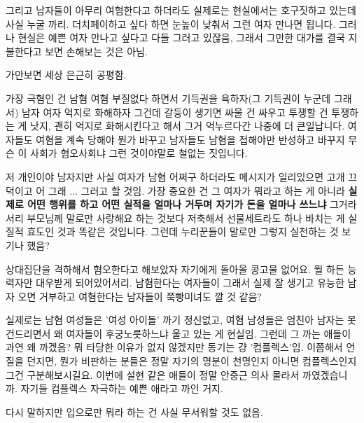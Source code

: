 그리고 남자들이 아무리 여혐한다고 하더라도 실제로는 현실에서는 호구짓하고 있는데 사실 누굴 까리.
더치페이하고 싶다 하면 눈높이 낮춰서 그런 여자 만나면 됩니다.
그러나 현실은 예쁜 여자 만나고 싶다고 다들 그러고 있잖음, 그래서 그만한 대가를 결국 지불한다고 보면 손해보는 것은 아님.
\vspace{5mm}

가만보면 세상 은근히 공평함.
\vspace{5mm}

가장 극혐인 건 남혐 여혐 부질없다 하면서 기득권을 욕하자(그 기득권이 누군데 그래서) 남자 여자 억지로 화해하자 그건데
갈등이 생기면 싸울 건 싸우고 투쟁할 건 투쟁하는 게 낫지, 괜히 억지로 화해시킨다고 해서 그거 억누르다간 나중에 더 큰일납니다.
여자들도 여혐을 계속 당해야 뭔가 바꾸고 남자들도 남혐을 접해야만 반성하고 바꾸지
무슨 이 사회가 혐오사회냐 그런 것이야말로 철없는 짓입니다.
\vspace{5mm}

저 개인이야 남자지만 사실 여자가 남혐 어쩌구 하더라도 메시지가 일리있으면 고개 끄덕이고 어 그래 ... 그러고 할 것임.
가장 중요한 건 그 여자가 뭐라고 하는 게 아니라 \textbf{실제로 어떤 행위를 하고 어떤 실적을 얼마나 거두며 자기가 돈을 얼마나 쓰느냐} 그거라서리
부모님께 말로만 사랑해요 하는 것보다 저축해서 선물세트라도 하나 바치는 게 실질적 효도인 것과 똑같은 것입니다.
그런데 누리꾼들이 말로만 그렇지 실천하는 것 보기나 했음?
\vspace{5mm}

상대집단을 격하해서 혐오한다고 해보았자 자기에게 돌아올 콩고물 없어요.
뭘 하든 능력자만 대우받게 되어있어서리.
남혐한다는 여자들이 그래서 실제 잘 생기고 유능한 남자 오면 거부하고 여혐한다는 남자들이 쭉빵미녀도 깔 것 같음?
\vspace{5mm}

실제로는 남혐 여성들은 '여성 아이돌' 까기 정신없고, 여혐 남성들은 엄친아 남자는 못 건드리면서 왜 여자들이 후궁노릇하느냐 울고 있는 게 현실임.
그런데 그 까는 애들이 과연 왜 까겠음? 뭐 타당한 이유가 없지 않겠지만 동기는 걍 '컴플렉스'임.
이쯤해서 언질을 던지면, 뭔가 비판하는 분들은 정말 자기의 명분이 천명인지 아니면 컴플렉스인지 그건 구분해보시길요.
이번에 설현 같은 애들이 정말 안중근 의사 몰라서 까였겠습니까. 자기들 컴플렉스 자극하는 예쁜 애라고 까인 거지.
\vspace{5mm}

다시 말하지만 입으로만 뭐라 하는 건 사실 무서워할 것도 없음.
\vspace{5mm}






